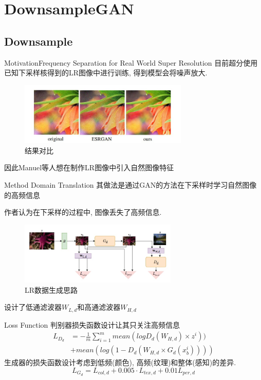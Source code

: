 \section{DownsampleGAN}

\subsection{Downsample}
\begin{frame}{Motivation}{Frequency Separation for Real World Super Resolution}
    \small
    目前超分使用已知下采样核得到的LR图像中进行训练, 得到模型会将噪声放大. 
    \begin{figure}
        \centering
        \includegraphics[height=3cm]{pic/pic0101.jpg}
        \caption{结果对比}
        \label{fig:0101}
    \end{figure}
    因此Manuel等人想在制作LR图像中引入自然图像特征
\end{frame}

\begin{frame}{Method Domain Translation}
    \small
    其做法是通过GAN的方法在下采样时学习自然图像的高频信息

    作者认为在下采样的过程中, 图像丢失了高频信息.
    \begin{figure}
        \centering
        \includegraphics[height=3cm]{pic/pic0102.jpg}
        \caption{LR数据生成思路}
        \label{fig:0102}
    \end{figure}
    设计了低通滤波器$W_{L,d}$和高通滤波器$W_{H,d}$
\end{frame}

\begin{frame}{Loss Function}
    判别器损失函数设计让其只关注高频信息
    \begin{align*}
        L_{D_{d}} &=-\frac{1}{m}\sum_{i=1}^{m}mean(log D_{d}(W_{H,d})\times z^{i})) \\
        &+ mean(log(1-D_{d}(W_{H,d}\times G_{d}(x_{b}^{i}))))
    \end{align*}
    生成器的损失函数设计考虑到低频(颜色), 高频(纹理)和整体(感知)的差异.
    \begin{equation*}
        L_{G_{d}}=L_{col,d}+0.005\cdot L_{tex,d} + 0.01L_{per,d}
    \end{equation*}
\end{frame}

